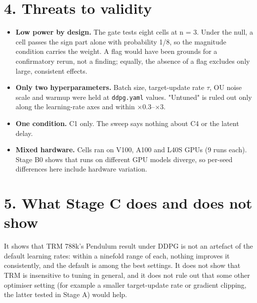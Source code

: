 \documentclass[11pt]{article}
\begin{document}
\section*{4. Threats to validity}



\begin{itemize}
\item \textbf{Low power by design.} The gate tests eight cells at n = 3. Under the null, a cell passes the sign part alone with probability 1/8, so the magnitude condition carries the weight. A flag would have been grounds for a confirmatory rerun, not a finding; equally, the absence of a flag excludes only large, consistent effects.
\item \textbf{Only two hyperparameters.} Batch size, target-update rate $\tau$, OU noise scale and warmup were held at \texttt{ddpg.yaml} values. "Untuned" is ruled out only along the learning-rate axes and within $\times$0.3--$\times$3.
\item \textbf{One condition.} C1 only. The sweep says nothing about C4 or the latent delay.
\item \textbf{Mixed hardware.} Cells ran on V100, A100 and L40S GPUs (9 runs each). Stage B0 shows that runs on different GPU models diverge, so per-seed differences here include hardware variation.
\end{itemize}



\section*{5. What Stage C does and does not show}



It shows that TRM 788k's Pendulum result under DDPG is not an artefact of the default learning rates: within a ninefold range of each, nothing improves it consistently, and the default is among the best settings. It does not show that TRM is insensitive to tuning in general, and it does not rule out that some other optimiser setting (for example a smaller target-update rate or gradient clipping, the latter tested in Stage A) would help.
\end{document}
